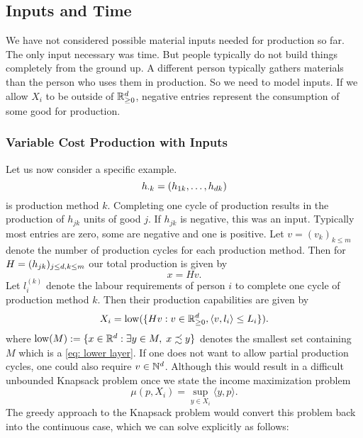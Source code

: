 \subsection{Inputs and Time}
\label{sec: inputs and time}

We have not considered possible material inputs needed for production so far.
The only input necessary was time. But people typically do not build things
completely from the ground up. A different person typically gathers materials
than the person who uses them in production. So we need to model inputs. If we
allow \(X_i\) to be outside of \(\mathbb{R}_{\ge 0}^d\), negative entries
represent the consumption of some good for production.

\subsubsection{Variable Cost Production with Inputs}

Let us now consider a specific example. 
\[
	h_{\cdot k} = (h_{1k},\dots, h_{d k})\]
is production method \(k\). Completing one cycle of production results in the
production of \(h_{jk}\) units of good \(j\). If \(h_{jk}\) is negative, this
was an input. Typically most entries are zero, some are negative and one is
positive. Let \(v = (v_k)_{k\le m}\) denote the number of production cycles for
each production method. Then for \(H=(h_{jk})_{j\le d,k\le m}\) our total
production is given by
\[
	x = Hv.
\]
Let \(l_i^{(k)}\) denote the labour requirements of person \(i\) to complete
one cycle of production method \(k\). Then their production capabilities are
given by
\[
	X_i = \operatorname{low}(\{ Hv : v\in \mathbb{R}_{\ge 0}^d, \langle v, l_i\rangle \le L_i\}).
\]
where \(\operatorname{low}(M):=\{x\in \mathbb{R}^{d}: \exists y\in M,\; x\precsim y\}\) denotes
the smallest set containing \(M\) which is a \ref{eq: lower layer}. If one does
not want to allow partial production cycles, one could also require
\(v\in\mathbb{N}^d\). Although this would result in a difficult unbounded
Knapsack problem once we state the income maximization problem
\[
	\mu(p, X_i)	= \sup_{y\in X_i} \langle y, p\rangle.
\]
The greedy approach to the Knapsack problem
would convert this problem back into the continuous case, which we can solve
explicitly as follows:


